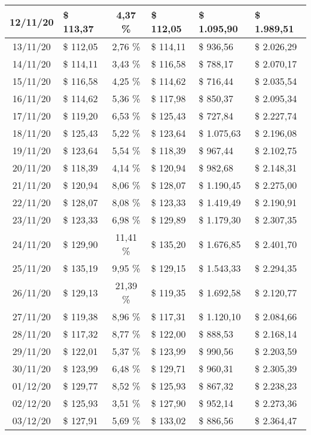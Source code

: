\begin{center}
\begin{small}
\begin{longtable}{|c|l|c|l|l|l|}
12/11/20 & \$ 113,37 & 4,37 \% & \$ 112,05 & \$ 1.095,90 & \$ 1.989,51 \\ \hline
13/11/20 & \$ 112,05 & 2,76 \% & \$ 114,11 & \$ 936,56 & \$ 2.026,29 \\ \hline
14/11/20 & \$ 114,11 & 3,43 \% & \$ 116,58 & \$ 788,17 & \$ 2.070,17 \\ \hline
15/11/20 & \$ 116,58 & 4,25 \% & \$ 114,62 & \$ 716,44 & \$ 2.035,54 \\ \hline
16/11/20 & \$ 114,62 & 5,36 \% & \$ 117,98 & \$ 850,37 & \$ 2.095,34 \\ \hline
17/11/20 & \$ 119,20 & 6,53 \% & \$ 125,43 & \$ 727,84 & \$ 2.227,74 \\ \hline
18/11/20 & \$ 125,43 & 5,22 \% & \$ 123,64 & \$ 1.075,63 & \$ 2.196,08 \\ \hline
19/11/20 & \$ 123,64 & 5,54 \% & \$ 118,39 & \$ 967,44 & \$ 2.102,75 \\ \hline
20/11/20 & \$ 118,39 & 4,14 \% & \$ 120,94 & \$ 982,68 & \$ 2.148,31 \\ \hline
21/11/20 & \$ 120,94 & 8,06 \% & \$ 128,07 & \$ 1.190,45 & \$ 2.275,00 \\ \hline
22/11/20 & \$ 128,07 & 8,08 \% & \$ 123,33 & \$ 1.419,49 & \$ 2.190,91 \\ \hline
23/11/20 & \$ 123,33 & 6,98 \% & \$ 129,89 & \$ 1.179,30 & \$ 2.307,35 \\ \hline
24/11/20 & \$ 129,90 & 11,41 \% & \$ 135,20 & \$ 1.676,85 & \$ 2.401,70 \\ \hline
25/11/20 & \$ 135,19 & 9,95 \% & \$ 129,15 & \$ 1.543,33 & \$ 2.294,35 \\ \hline
26/11/20 & \$ 129,13 & 21,39 \% & \$ 119,35 & \$ 1.692,58 & \$ 2.120,77 \\ \hline
27/11/20 & \$ 119,38 & 8,96 \% & \$ 117,31 & \$ 1.120,10 & \$ 2.084,66 \\ \hline
28/11/20 & \$ 117,32 & 8,77 \% & \$ 122,00 & \$ 888,53 & \$ 2.168,14 \\ \hline
29/11/20 & \$ 122,01 & 5,37 \% & \$ 123,99 & \$ 990,56 & \$ 2.203,59 \\ \hline
30/11/20 & \$ 123,99 & 6,48 \% & \$ 129,71 & \$ 960,31 & \$ 2.305,39 \\ \hline
01/12/20 & \$ 129,77 & 8,52 \% & \$ 125,93 & \$ 867,32 & \$ 2.238,23 \\ \hline
02/12/20 & \$ 125,93 & 3,51 \% & \$ 127,90 & \$ 952,14 & \$ 2.273,36 \\ \hline
03/12/20 & \$ 127,91 & 5,69 \% & \$ 133,02 & \$ 886,56 & \$ 2.364,47 \\ \hline

\end{longtable}
\end{small}
\end{center}

